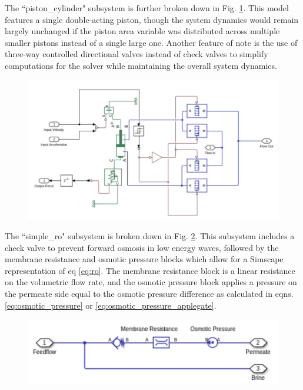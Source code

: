 \documentclass[twocolumn,10pt]{asme2e}
\begin{document}
The ``piston\_cylinder" subsystem is further broken down in Fig. \ref{fig:piston_simscape}. This model features a single double-acting piston, though the system dynamics would remain largely unchanged if the piston area variable was distributed across multiple smaller pistons instead of a single large one. Another feature of note is the use of three-way controlled directional valves instead of check valves to simplify computations for the solver while maintaining the overall system dynamics.

\begin{figure}
    \includegraphics[width=\linewidth]{../figs/pistonsimscape.pdf}
    \label{fig:piston_simscape}
\end{figure}

The ``simple\_ro" subsystem is broken down in Fig. \ref{fig:ro_simscape}. This subsystem includes a check valve to prevent forward osmosis in low energy waves, followed by the membrane resistance and osmotic pressure blocks which allow for a Simscape representation of eq \ref{eq:ro}. The membrane resistance block is a linear resistance on the volumetric flow rate, and the osmotic pressure block applies a pressure on the permeate side equal to the osmotic pressure difference as calculated in eqns. \ref{eq:osmotic_pressure} or \ref{eq:osmotic_pressure_applegate}.

\begin{figure}
    \centering
    \includegraphics[width=0.8\linewidth]{../figs/desalsimscape.pdf}
    \label{fig:ro_simscape}
\end{figure}
\end{document}
